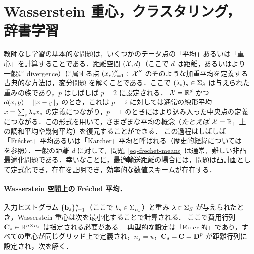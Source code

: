 \section{Wasserstein 重心，クラスタリング，辞書学習}
\label{sec-bary}

教師なし学習の基本的な問題は，いくつかのデータ点の「平均」あるいは「重心」を計算することである．距離空間 $(\mathcal{X},d)$（ここで $d$ は距離，あるいはより一般に divergence）に属する点 $(x_s)_{s=1}^S \in \mathcal{X}^S$ のそのような加重平均を定義する古典的な方法は，変分問題
を解くことである．ここで $(\lambda_s)_s \in \Sigma_S$ は与えられた重みの族であり，$p$ はしばしば $p=2$ に設定される．
%
$\mathcal{X}=\mathbb{R}^d$ かつ $d(x,y)=\left\| x-y \right\|_2$ のとき，これは $p=2$ に対しては通常の線形平均 $x=\sum_s \lambda_s x_s$ の定義につながり，$p=1$ のときにはより込み入った中央点の定義につながる．この形式を用いて，さまざまな平均の概念（\emph{たとえば} $\mathcal{X}=\mathbb{R}_+$ 上の調和平均や幾何平均）を復元することができる．
%
この過程はしばしば「Fr\'echet」平均あるいは「Karcher」平均と呼ばれる（歴史的経緯については~\citet{karcher2014riemannian} を参照）．一般の距離 $d$ に対して，問題~\eqref{eq-frechet-means} は通常，難しい非凸最適化問題である．幸いなことに，最適輸送距離の場合には，問題は凸計画として定式化でき，存在を証明でき，効率的な数値スキームが存在する．


\paragraph{Wasserstein 空間上の Fr\'echet 平均．}

入力ヒストグラム $\{\mathrm{\textbf{b}}_s\}_{s=1}^S$（ここで $b_s \in \Sigma_{n_s}$）と重み $\lambda \in \Sigma_S$ が与えられたとき，Wasserstein 重心は次を最小化することで計算される．
ここで費用行列 $\mathrm{\textbf{C}}_s \in \mathbb{R}^{n \times n_s}$ は指定される必要がある．
%
典型的な設定は「Euler 的」であり，すべての重心が同じグリッド上で定義され，$n_s=n$，$\mathrm{\textbf{C}}_s=\mathrm{\textbf{C}}=\mathrm{\textbf{D}}^p$ が距離行列に設定され，次を解く．

